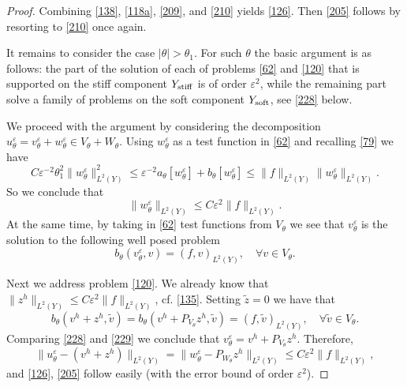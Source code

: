 \documentclass[11pt]{article}
\newcommand\e {\varepsilon}
\newcommand\stiff{{\rm stiff}}
\newcommand\soft{{\rm soft}}
\theoremstyle{remark}
\begin{document}
\begin{proof}
	Combining \eqref{138}, \eqref{118a}, \eqref{209}, and \eqref{210} yields \eqref{126}. Then \eqref{205} follows by resorting to \eqref{210} once again.
	
	It remains to consider the case $|\theta| > \theta_1$. For such $\theta$ the basic argument is as follows: the part of the solution of each of problems \eqref{62} and \eqref{120} that is supported on the stiff component $Y_\stiff$ is of order $\e^2$, while the remaining part solve a family of problems on the soft component $Y_\soft$, see \eqref{228} below.
	
	We proceed with the argument by considering the decomposition $u_\theta^\e = v_\theta^\e + w_\theta^\e \in V_\theta + W_\theta$. Using  $w_\theta^\e$ as a test function in \eqref{62} and recalling \eqref{79} we have
	\begin{equation*}
		C \e^{-2}  \theta_1^2 \|w_\theta^\e\|_{L^2(Y)}^2 \leq \e^{-2} a_\theta[w_\theta^\e] + b_\theta[w_\theta^\e] \leq \|f \|_{L^2(Y)} \|w_\theta^\e  \|_{L^2(Y)}.
	\end{equation*}
	So we conclude that
	\begin{equation*}
		\|w_\theta^\e \|_{L^2(Y)} \leq C \e^2 \| f\|_{L^2(Y)}.
	\end{equation*}
	At the same time, by taking in \eqref{62} test functions from $V_\theta$ we see that  $v_\theta^\e$ is the solution to the following well posed problem
	\begin{equation}\label{228}
		b_\theta(v_\theta^\e, v) = ( f, v)_{L^2(Y)}, \quad \forall v\in V_\theta.
	\end{equation}
	
	Next we address problem \eqref{120}. We already know that $\| z^h\|_{L^2(Y)} \leq C \e^{2} \|f \|_{L^2(Y)}$, cf. \eqref{135}.  Setting $\widetilde z = 0$ we have that
	\begin{equation}\label{229}
		b_\theta(v^h +  z^h, \tilde v) =b_\theta(v^h + P_{V_\theta} z^h, \tilde v) =   ( f, \tilde v)_{L^2(Y)}, \quad \forall  \tilde  v   \in V_\theta.
	\end{equation}
	Comparing \eqref{228} and \eqref{229} we conclude that $v_\theta^\e = v^h + P_{V_\theta} z^h$. Therefore,
	\begin{equation*}
		\| u_\theta^\e - (v^h + z^h)\|_{L^2(Y)} = \| w_\theta^\e - P_{W_\theta}  z^h\|_{L^2(Y)} \leq C \e^{2} \|f \|_{L^2(Y)},
	\end{equation*}
	and \eqref{126}, \eqref{205} follow easily (with the error bound of order $\e^2$).
	
\end{proof}
\end{document}
